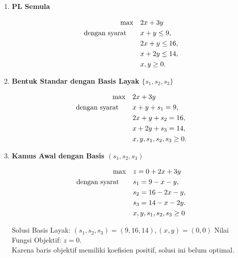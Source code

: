 \begin{enumerate}
    \item \textbf{PL Semula}  
    \begin{tcolorbox}[colback=orange!5!white, colframe=orange!75!black,    
    width=0.6\textwidth, %
    box align=center, 
    title=\textbf{Program Linier yang Akan Diselesaikan}]
    \[
    \begin{aligned}
    \max \quad & 2x + 3y \\
    \mbox{dengan syarat}\quad \quad 
    & x + y \leq 9, \\
    & 2x + y \leq 16, \\
    & x + 2y \leq 14, \\
    & x, y \geq 0.
    \end{aligned}
    \]
    \end{tcolorbox}

    \item \textbf{Bentuk Standar dengan Basis Layak $\{s_1, s_2, s_3\}$}  
    \begin{tcolorbox}[colback=gray!5!white, colframe=gray!75!black,    
    width=0.6\textwidth, %
    box align=center, 
    title=\textbf{Bentuk Standar}]
    \[
    \begin{aligned}
    \max \quad & 2x + 3y \\
    \mbox{dengan syarat}\quad \quad 
    & x + y + s_1 = 9, \\
    & 2x + y + s_2 = 16, \\
    & x + 2y + s_3 = 14, \\
    & x, y, s_1, s_2, s_3 \geq 0.
    \end{aligned}
    \]
    \end{tcolorbox}

    \item \textbf{Kamus Awal dengan Basis \( (s_1, s_2, s_3) \)}
    \begin{tcolorbox}[colback=blue!5!white, colframe=blue!75!black,    
    width=0.6\textwidth, %
    box align=center, 
    title=\textbf{Kamus Awal}]
    \[
    \begin{aligned}
    \max \quad & z = 0 + 2x + 3y \\
    \mbox{dengan syarat}\quad \quad 
    & s_1 = 9 - x - y, \\
    & s_2 = 16 - 2x - y, \\
    & s_3 = 14 - x - 2y.\\
    & x,y,s_1, s_2, s_3 \geq 0
    \end{aligned}
    \]
    \end{tcolorbox}
    Solusi Basis Layak: \( (s_1, s_2, s_3) = (9,16,14), (x,y) = (0,0) \)  
    Nilai Fungsi Objektif: \( z = 0 \).\\  
    Karena baris objektif memiliki koefisien positif, solusi ini belum optimal.
    

\end{enumerate}
